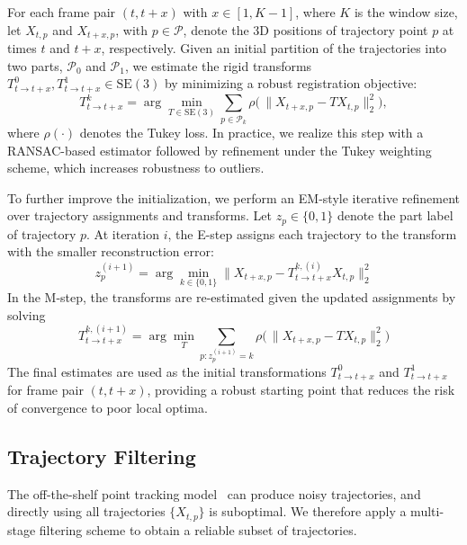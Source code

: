 For each frame pair $(t, t{+}x)$ with $x \in [1, K-1]$, where $K$ is the window size, let $X_{t,p}$ and $X_{t+x,p}$, with $p\in\mathcal{P}$, denote the 3D positions of trajectory point $p$ at times $t$ and $t{+}x$, respectively. 
Given an initial partition of the trajectories into two parts, $\mathcal{P}_0$ and $\mathcal{P}_1$, we estimate the rigid transforms $T^0_{t\to t+x}, T^1_{t\to t+x} \in \mathrm{SE}(3)$ by minimizing a robust registration objective:
\begin{equation}
    T^k_{t\to t+x}
    = \arg\min_{T \in \mathrm{SE}(3)} 
    \sum_{p \in \mathcal{P}_k} 
    \rho\big(\,\lVert X_{t+x,p} - T X_{t,p} \rVert_2^2\big),
    \label{eq:init_reg}
\end{equation}
where $\rho(\cdot)$ denotes the Tukey loss. 
In practice, we realize this step with a RANSAC-based estimator followed by refinement under the Tukey weighting scheme, which increases robustness to outliers.

To further improve the initialization, we perform an EM-style iterative refinement over trajectory assignments and transforms. 
Let $z_p \in \{0,1\}$ denote the part label of trajectory $p$. 
At iteration $i$, the E-step assigns each trajectory to the transform with the smaller reconstruction error:
\begin{equation*}
    z_p^{(i+1)} 
    = \arg\min_{k \in \{0,1\}} 
    \lVert X_{t+x,p} - T^{k,(i)}_{t\to t+x} X_{t,p} \rVert_2^2
    \label{eq:em_estep}
\end{equation*}
In the M-step, the transforms are re-estimated given the updated assignments by solving
\begin{equation*}
    T^{k,(i+1)}_{t\to t+x} 
    = \arg\min_{T} 
    \sum_{p : z_p^{(i+1)} = k} 
    \rho\big(\,\lVert X_{t+x,p} - T X_{t,p} \rVert_2^2\big)
    \label{eq:em_mstep}
\end{equation*}
The final estimates are used as the initial transformations $T^0_{t\to t+x}$ and $T^1_{t\to t+x}$ for frame pair $(t,t{+}x)$, providing a robust starting point that reduces the risk of convergence to poor local optima.

\subsection{Trajectory Filtering}
\label{sec:filter}
The off-the-shelf point tracking model~\cite{alltracker} can produce noisy trajectories, and directly using all trajectories $\{X_{t,p}\}$ is suboptimal. We therefore apply a multi-stage filtering scheme to obtain a reliable subset of trajectories.

